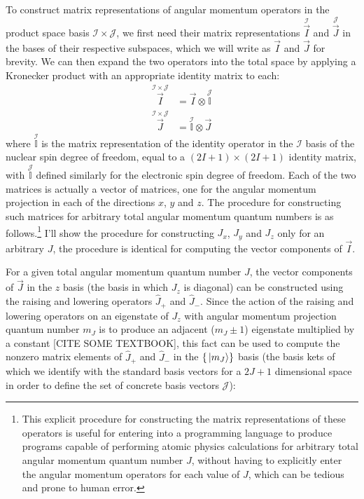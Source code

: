 To construct matrix representations of angular momentum operators in the product space basis ${\mathcal{I} \times \mathcal{J}}$, we first need their matrix representations $\overset{\scriptscriptstyle{\mathcal{I}}}{\vec I}$ and $\overset{\scriptscriptstyle{\mathcal{J}}}{\vec J}$ in the bases of their respective subspaces, which we will write as $\vec I$ and $\vec J$ for brevity. We can then expand the two operators into the total space by applying a Kronecker product with an appropriate identity matrix to each:
\begin{align}\label{eq:kronecker_identity_I}
\overset{\scriptscriptstyle{\mathcal{I}\times\mathcal{J}}}{\vec I}
 &= \vec I \otimes \overset{\scriptscriptstyle{\mathcal{J}}}{\mathbb{I}}\\
\label{eq:kronecker_identity_J}
\overset{\scriptscriptstyle{\mathcal{I}\times\mathcal{J}}}{\vec J}
&= \overset{\scriptscriptstyle{\mathcal{I}}}{\mathbb{I}} \otimes \vec J
\end{align}
where $\overset{\scriptscriptstyle{\mathcal{I}}}{\mathbb{I}}$ is the matrix representation of the identity operator in the $\mathcal{I}$ basis of the nuclear spin degree of freedom, equal to a $(2I+1)\times(2I+1)$ identity matrix, with $\overset{\scriptscriptstyle{\mathcal{J}}}{\mathbb{I}}$ defined similarly for the electronic spin degree of freedom. Each of the two matrices is actually a vector of matrices, one for the angular momentum projection in each of the directions $x$, $y$ and $z$. The procedure for constructing such matrices for arbitrary total angular momentum quantum numbers is as follows.\footnote{This explicit procedure for constructing the matrix representations of these operators is useful for entering into a programming language to produce programs capable of performing atomic physics calculations for arbitrary total angular momentum quantum number $J$, without having to explicitly enter the angular momentum operators for each value of $J$, which can be tedious and prone to human error.} I'll show the procedure for constructing $J_x$, $J_y$ and $J_z$ only for an arbitrary $J$, the procedure is identical for computing the vector components of $\vec I$.

For a given total angular momentum quantum number $J$, the vector components of $\vec J$ in the $z$ basis (the basis in which $J_z$ is diagonal) can be constructed using the raising and lowering operators $\hat J_+$ and $\hat J_-$. Since the action of the raising and lowering operators on an eigenstate of $J_z$ with angular momentum projection quantum number $m_J$ is to produce an adjacent ($m_J \pm 1$) eigenstate multiplied by a constant [CITE SOME TEXTBOOK], this fact can be used to compute the nonzero matrix elements of $\hat J_+$ and $\hat J_-$ in the $\{\ket{m_J}\}$ basis (the basis kets of which we identify with the standard basis vectors for a $2J+1$ dimensional space in order to define the set of concrete basis vectors $\mathcal{J}$):

